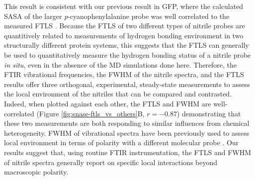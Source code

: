 This result is consistent with our previous result in GFP, where the calculated SASA of the larger \emph{p}-cyanophenylalanine probe was well correlated to the measured FTLS \cite{First2018}. 
Because the FTLS of two different types of nitrile probes are quantitively related to measurements of hydrogen bonding environment in two structurally different protein systems, this suggests that the FTLS can generally be used to quantitatively measure the hydrogen bonding status of a nitrile probe \emph{in situ}, even in the absence of the MD simulations done here. 
Therefore, the FTIR vibrational frequencies, the FWHM of the nitrile spectra, and the FTLS results offer three orthogonal, experimental, steady-state measurements to assess the local environment of the nitriles that can be compared and contrasted. 
Indeed, when plotted against each other, the FTLS and FWHM are well-correlated (Figure \ref{fig:snase-ftls_vs_others}B, $r = -0.87$) demonstrating that these two measurements are both responding to similar influences from chemical heterogeneity. 
FWHM of vibrational spectra have been previously used to assess local environment in terms of polarity with a different molecular probe \cite{Manor2012}. 
Our results suggest that, using routine FTIR instrumentation, the FTLS and FWHM of nitrile spectra generally report on specific local interactions beyond macroscopic polarity.

